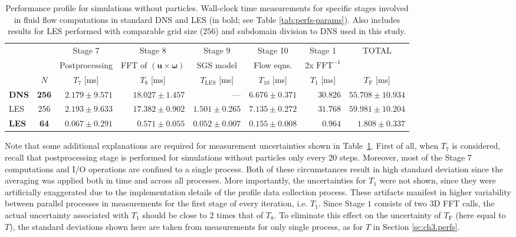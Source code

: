 \documentclass{pracamgren}
\begin{document}
\begin{table}[h]
\centering
\scriptsize
\begin{tabular}{lcrrrrrr}
& & \multicolumn{1}{c}{Stage 7} &  \multicolumn{1}{c}{Stage 8} & \multicolumn{1}{c}{Stage 9} & \multicolumn{1}{c}{Stage 10} &  \multicolumn{1}{c}{Stage 1} & \multicolumn{1}{c}{TOTAL} \\
& & \multicolumn{1}{c}{Postprocessing} &  \multicolumn{1}{c}{FFT of $(\mathbf{u} \times \boldsymbol{\omega})$} &  \multicolumn{1}{c}{SGS model} &  \multicolumn{1}{c}{Flow eqns.} & \multicolumn{1}{c}{2x $\text{FFT}^{-1}$} & \\
& $N$ & \multicolumn{1}{c}{$T_7$ [ms]} & \multicolumn{1}{c}{$T_8$ [ms]} & \multicolumn{1}{c}{$T_{\text{LES}}$ [ms]} & \multicolumn{1}{c}{$T_{10}$ [ms]} & \multicolumn{1}{c}{$T_1$ [ms]} & \multicolumn{1}{c}{$T_{\text{F}}$ [ms]} \\ \hline
\textbf{DNS} & \textbf{256} & $2.179 \pm 9.571$ & $18.027 \pm 1.457$ & --- & $6.676 \pm 0.371$ & $30.826$ & $55.708 \pm 10.934$ \\
LES & 256 & $2.193 \pm 9.633$ & $17.382 \pm 0.902$ & $1.501 \pm 0.265$ & $7.135 \pm 0.272$ & $31.768$ & $59.981 \pm 10.204$ \\
\textbf{LES} & \textbf{64} & $0.067 \pm 0.291$ & $0.571 \pm 0.055$ & $0.052 \pm 0.007$ & $0.155 \pm 0.008$ & $0.964$ & $1.808 \pm 0.337$ \\
\end{tabular}
\caption{Performance profile for simulations without particles.
Wall-clock time measurements for specific stages involved in fluid flow computations in standard DNS and LES (in bold; see Table \ref{tab:perfs-params}).
Also includes results for LES performed with comparable grid size ($256$) and subdomain division to DNS used in this study.
}
\label{tab:pff-flow}
\end{table}

Note that some additional explanations are required for measurement uncertainties shown in Table~\ref{tab:pff-flow}.
First of all, when $T_7$ is considered, recall that postprocessing stage is performed for simulations without particles only every 20 steps.
Moreover, most of the Stage $7$ computations and I/O operations are confined to a single process.
Both of these circumstances result in high standard deviation since the averaging was applied both in time and across all processes.
More importantly, the uncertainties for $T_1$ were not shown, since they were artificially exaggerated due to the implementation details of the profile data collection process.
These artifacts manifest in higher variability between parallel processes in measurements for the first stage of every iteration, i.e. $T_1$.
Since Stage $1$ consists of two 3D FFT calls, the actual uncertainty associated with $T_1$ should be close to $2$ times that of $T_8$.
To eliminate this effect on the uncertainty of $T_{\text{F}}$ (here equal to $T$), the standard deviations shown here are taken from measurements for only single process, as for $T$ in Section \ref{sc:ch3.perfs}.  
\end{document}
